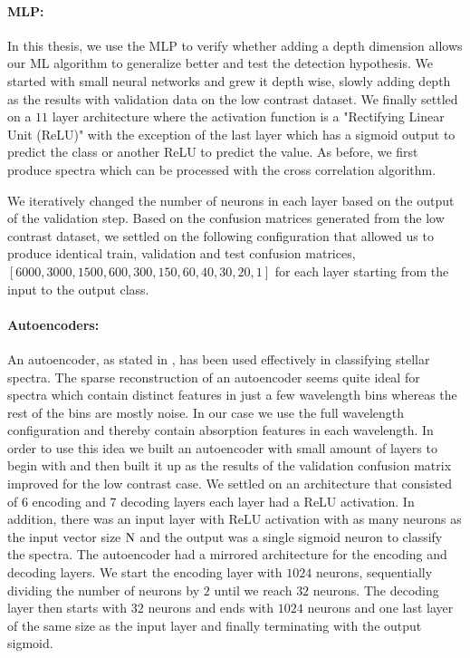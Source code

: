 \paragraph{MLP:\\}
In this thesis, we use the MLP to verify whether adding a depth dimension allows our ML algorithm to generalize better and test the detection hypothesis.
We started with small neural networks and grew it depth wise, slowly adding depth as the results with validation data on the low contrast dataset. 
We finally settled on a $11$ layer architecture where the activation function is a "Rectifying Linear Unit (ReLU)" with the exception of the last layer which has a sigmoid output to predict the class or another ReLU to predict the value.
As before, we first produce spectra which can be processed with the cross correlation algorithm.

We iteratively changed the number of neurons in each layer based on the output of the validation step. 
Based on the confusion matrices generated from the low contrast dataset, we settled on the following configuration that allowed us to produce identical train, validation and test confusion matrices, 
$\left[6000,3000,1500,600,300,150,60,40,30,20,1\right]$ for each layer starting from the input to the output class.
\paragraph{Autoencoders:\\}
An autoencoder, as stated in , has been used effectively in classifying stellar spectra.
The sparse reconstruction of an autoencoder seems quite ideal for spectra which contain distinct features in just a few wavelength bins whereas the rest of the bins are mostly noise.
In our case we use the full wavelength configuration and thereby contain absorption features in each wavelength.
In order to use this idea we built an autoencoder with small amount of layers to begin with and then built it up as the results of the validation confusion matrix improved for the low contrast case.
We settled on an architecture that consisted of $6$ encoding and $7$ decoding layers each layer had a ReLU activation.
In addition, there was an input layer with ReLU activation with as many neurons as the input vector size $\rm{N}$ and the output was a single sigmoid neuron to classify the spectra.
The autoencoder had a mirrored architecture for the encoding and decoding layers.
We start the encoding layer with $1024$ neurons, sequentially dividing the number of neurons by $2$ until we reach $32$ neurons.
The decoding layer then starts with $32$ neurons and ends with $1024$ neurons and one last layer of the same size as the input layer and finally terminating with the output sigmoid.

